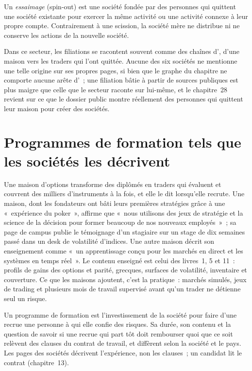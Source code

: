\begin{definition}[Essaimage]\label{def:in:the-options-market-making-houses:spinout}
Un \emph{essaimage} (spin-out) est une société fondée par des personnes qui quittent une société existante pour exercer la même activité ou une activité connexe
à leur propre compte. Contrairement à une scission, la société mère ne distribue ni ne conserve les actions de la nouvelle société.
\end{definition}

Dans ce secteur, les filiations se racontent souvent comme des chaînes d', d'une maison vers les traders qui l'ont quittée. Aucune des
six sociétés ne mentionne une telle origine sur ses propres pages, si bien que le graphe du chapitre ne comporte aucune arête d'~; une filiation bâtie à partir de sources
publiques est plus maigre que celle que le secteur raconte sur lui-même, et le chapitre~28 revient sur ce que le dossier public
montre réellement des personnes qui quittent leur maison pour créer des sociétés.

\section{Programmes de formation tels que les sociétés les décrivent}

Une maison d'options transforme des diplômés en traders qui évaluent et couvrent des milliers d'instruments à la fois, et elle le dit
lorsqu'elle recrute. Une maison, dont les fondateurs ont bâti leurs premières stratégies grâce à une «~expérience du poker~», affirme que «~nous utilisons des jeux de stratégie et la science de la décision pour
former beaucoup de nos nouveaux employés~»~; sa page de campus publie le témoignage d'un stagiaire sur un stage de dix semaines passé dans un desk de
volatilité d'indices. Une autre maison décrit son enseignement comme «~un apprentissage conçu pour les marchés en direct et les systèmes en temps réel~».
Le contenu enseigné est celui des livres~1, 5 et 11~: profils de gains des options et parité, grecques, surfaces de volatilité,
inventaire et couverture. Ce que les maisons ajoutent, c'est la pratique~: marchés simulés, jeux de trading et plusieurs mois de travail supervisé
avant qu'un trader ne détienne seul un risque.

\begin{remark}\label{rem:in:the-options-market-making-houses:programme}
Un programme de formation est l'investissement de la société pour faire d'une recrue une personne à qui elle confie des risques. Sa durée, son
contenu et la question de savoir si une recrue qui part tôt doit rembourser quoi que ce soit relèvent des clauses du contrat de travail, et diffèrent selon
la société et le pays. Les pages des sociétés décrivent l'expérience, non les clauses~; un candidat lit le contrat
(chapitre~13).
\end{remark}

